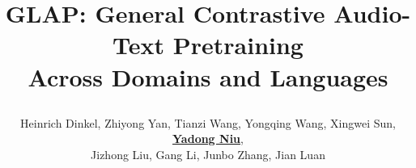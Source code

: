 


\graphicspath{{assets/}}
\renewcommand{\PosterContentFontSize}{\fontsize{28pt}{34pt}\selectfont}

\title{\parbox{\linewidth}{\centering GLAP: General Contrastive Audio-Text Pretraining \\ Across Domains and Languages}}
\author{Heinrich Dinkel,
    Zhiyong Yan,
    Tianzi Wang,
    Yongqing Wang,
    Xingwei Sun,
    \underline{\textbf{Yadong Niu}},\\
    Jizhong Liu,
    Gang Li,
    Junbo Zhang,
    Jian Luan}
\titlegraphicleft{\PosterLeftLogo}
\titlegraphic{\PosterRightLogo}

\newcommand{\PosterRepositoryUrl}{https://github.com/xiaomi-research/dasheng-glap}
\newcommand{\PosterRepositoryText}{github.com/xiaomi-research/dasheng-glap}
